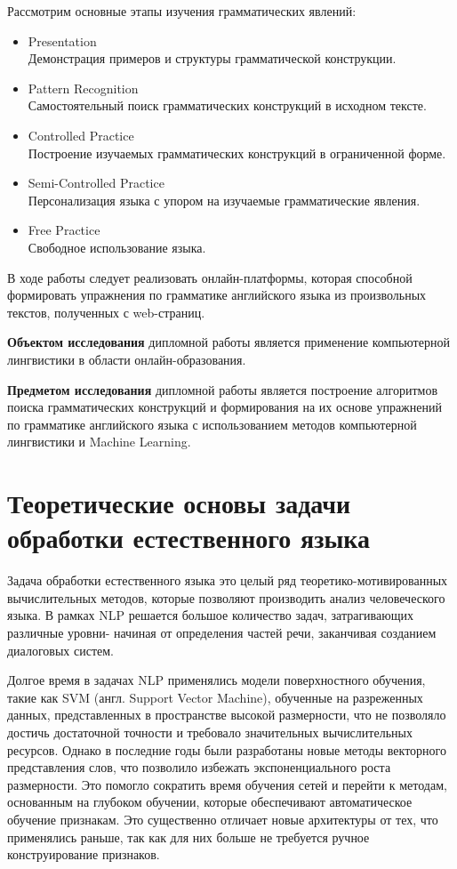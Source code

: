 Рассмотрим основные этапы изучения грамматических явлений:

\begin{itemize}
  \item Presentation \\ Демонстрация примеров и структуры грамматической конструкции.
  \item Pattern Recognition\\Самостоятельный поиск грамматических конструкций в исходном тексте.
 \item Controlled Practice\\Построение изучаемых грамматических конструкций в ограниченной форме.
 \item Semi-Controlled Practice\\Персонализация языка с упором на изучаемые грамматические явления.
 \item Free Practice\\Свободное использование языка.
\end{itemize}

В ходе работы следует реализовать онлайн-платформы, которая способной формировать упражнения по грамматике английского языка из произвольных текстов, полученных с web-страниц.

\textbf{Объектом исследования} дипломной работы является применение компьютерной лингвистики в области онлайн-образования.

\textbf{Предметом исследования} дипломной работы является построение алгоритмов поиска грамматических конструкций и формирования на их основе упражнений по грамматике английского языка с использованием методов компьютерной лингвистики и Machine Learning.

\newpage
\section{Теоретические основы задачи обработки естественного языка}
\label{sec:theory}

Задача обработки естественного языка это целый ряд теоретико-мотивированных вычислительных методов, которые позволяют производить анализ человеческого языка. В рамках NLP решается большое количество задач, затрагивающих различные уровни- начиная от определения частей речи, заканчивая созданием диалоговых систем.

Долгое время в задачах NLP применялись модели поверхностного обучения, такие как SVM (англ. Support Vector Machine), обученные на разреженных данных, представленных в пространстве высокой размерности, что не позволяло достичь достаточной точности и требовало значительных вычислительных ресурсов. Однако в последние годы были разработаны новые методы векторного представления слов, что позволило избежать экспоненциального роста размерности. Это помогло сократить время обучения сетей и перейти к методам, основанным на глубоком обучении, которые обеспечивают автоматическое обучение признакам. Это существенно отличает новые архитектуры от тех, что применялись раньше, так как для них больше не требуется ручное конструирование признаков.

